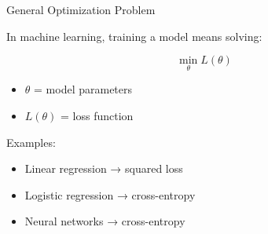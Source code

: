 \documentclass{beamer}
\begin{document}
\begin{frame}{General Optimization Problem}

In machine learning, training a model means solving:

\[
\min_{\theta} L(\theta)
\]

\vspace{0.5cm}

\begin{itemize}
    \item $\theta$ = model parameters
    \item $L(\theta)$ = loss function
\end{itemize}

\vspace{0.5cm}

Examples:

\begin{itemize}
    \item Linear regression → squared loss
    \item Logistic regression → cross-entropy
    \item Neural networks → cross-entropy
\end{itemize}

\end{frame}
\end{document}
